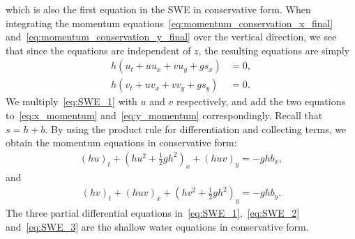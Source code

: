 which is also the first equation in the SWE in conservative form.
When integrating the momentum equations~\eqref{eq:momentum_conservation_x_final} and~\eqref{eq:momentum_conservation_y_final} over the vertical direction, we see that since the equations are independent of $z$, the resulting equations are simply
\begin{align}
    h(u_t + uu_x + vu_y + g s_x) &= 0, \label{eq:x_momentum} \\
    h(v_t + uv_x + vv_y + g s_y) &= 0. \label{eq:y_momentum}
\end{align}
We multiply~\eqref{eq:SWE_1} with $u$ and $v$ respectively, and add the two equations to~\eqref{eq:x_momentum} and~\eqref{eq:y_momentum} correspondingly.
Recall that $s = h + b$. 
By using the product rule for differentiation and collecting terms, we obtain the momentum equations in conservative form:
\begin{align}\label{eq:SWE_2}
    {(hu)}_t + {(hu^2 + \frac{1}{2}gh^2)}_x + {(huv)}_y = -gh b_x,
\end{align}
and 
\begin{align}\label{eq:SWE_3}
    {(hv)}_t + {(huv)}_x + {(hv^2 + \frac{1}{2}gh^2)}_y = -gh b_y.
\end{align}
The three partial differential equations in~\eqref{eq:SWE_1},~\eqref{eq:SWE_2} and~\eqref{eq:SWE_3} are the shallow water equations in conservative form.


